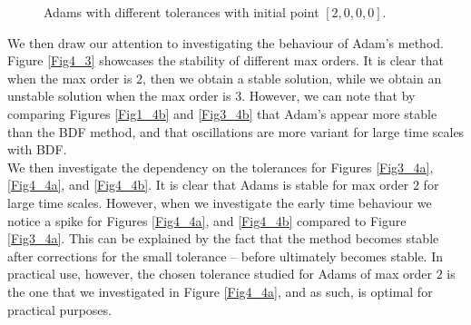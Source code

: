 \documentclass{article}
\begin{document}
\begin{figure}[H]
\centering
{}\hfill
{}\hfill
\caption{Adams with different tolerances with initial point \(\left[2,0,0,0\right]\).} \label{Fig4_4}
\end{figure}
We then draw our attention to investigating the behaviour of Adam's method. Figure \ref{Fig4_3} showcases the stability of different max orders. It is clear that when the max order is $2$, then we obtain a stable solution, while we obtain an unstable solution when the max order is $3$. However, we can note that by comparing Figures \ref{Fig1_4b} and \ref{Fig3_4b} that Adam's appear more stable than the BDF method, and that oscillations are more variant for large time scales with BDF. \\

We then investigate the dependency on the tolerances for Figures \ref{Fig3_4a}, \ref{Fig4_4a}, and \ref{Fig4_4b}. It is clear that Adams is stable for max order $2$ for large time scales. However, when we investigate the early time behaviour we notice a spike for Figures \ref{Fig4_4a}, and \ref{Fig4_4b} compared to Figure \ref{Fig3_4a}. This can be explained by the fact that the method becomes stable after corrections for the small tolerance -- before ultimately becomes stable. In practical use, however, the chosen tolerance studied for Adams of max order $2$ is the one that we investigated in Figure \ref{Fig4_4a}, and as such, is optimal for practical purposes. \\
\end{document}
